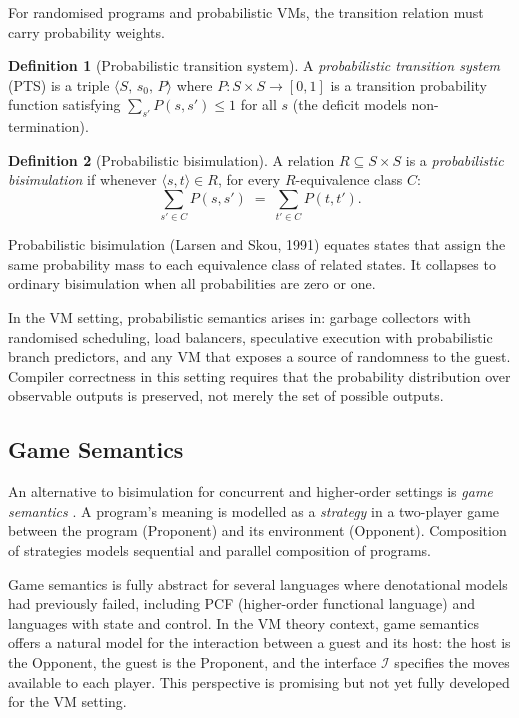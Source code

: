 \documentclass[11pt, a4paper]{article}
\theoremstyle{definition}
\newtheorem{definition}{Definition}[section]
\theoremstyle{plain}
\theoremstyle{remark}
\begin{document}
For randomised programs and probabilistic VMs, the transition relation must
carry probability weights.

\begin{definition}[Probabilistic transition system]
  A \emph{probabilistic transition system} (PTS) is a triple
  $\langle S,\, s_0,\, P\rangle$ where $P : S \times S \to [0,1]$ is a transition
  probability function satisfying $\sum_{s'} P(s, s') \leq 1$ for all
  $s$ (the deficit models non-termination).
\end{definition}

\begin{definition}[Probabilistic bisimulation]
  A relation $R \subseteq S \times S$ is a \emph{probabilistic bisimulation}
  if whenever $\langle s, t\rangle \in R$, for every $R$-equivalence class $C$:
  \[
    \sum_{s' \in C} P(s, s') \;=\; \sum_{t' \in C} P(t, t').
  \]
\end{definition}

Probabilistic bisimulation (Larsen and Skou, 1991) equates states that
assign the same probability mass to each equivalence class of related states.
It collapses to ordinary bisimulation when all probabilities are zero or one.

In the VM setting, probabilistic semantics arises in: garbage collectors
with randomised scheduling, load balancers, speculative execution with
probabilistic branch predictors, and any VM that exposes a source of
randomness to the guest. Compiler correctness in this setting requires that
the probability distribution over observable outputs is preserved, not
merely the set of possible outputs.

\subsection{Game Semantics}

An alternative to bisimulation for concurrent and higher-order settings is
\emph{game semantics} \citep{abramsky2000,hyland2000}.
A program's meaning is modelled as a \emph{strategy} in a two-player game
between the program (Proponent) and its environment (Opponent). Composition
of strategies models sequential and parallel composition of programs.

Game semantics is fully abstract for several languages where denotational
models had previously failed, including PCF (higher-order functional
language) and languages with state and control. In the VM theory context,
game semantics offers a natural model for the interaction between a guest
and its host: the host is the Opponent, the guest is the Proponent, and the
interface $\mathcal{I}$ specifies the moves available to each player. This
perspective is promising but not yet fully developed for the VM setting.
\end{document}
